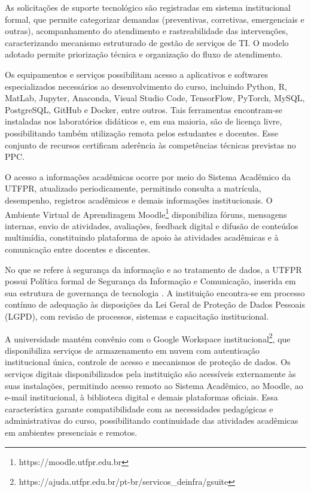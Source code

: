 As solicitações de suporte tecnológico são registradas em sistema institucional formal, que permite categorizar demandas (preventivas, corretivas, emergenciais e outras), acompanhamento do atendimento e rastreabilidade das intervenções, caracterizando mecanismo estruturado de gestão de serviços de TI. O modelo adotado permite priorização técnica e organização do fluxo de atendimento.

Os equipamentos e serviços possibilitam acesso a aplicativos e softwares especializados necessários ao desenvolvimento do curso, incluindo Python, R, MatLab, Jupyter, Anaconda, Visual Studio Code, TensorFlow, PyTorch, MySQL, PostgreSQL, GitHub e Docker, entre outros. Tais ferramentas encontram-se instaladas nos laboratórios didáticos e, em sua maioria, são de licença livre, possibilitando também utilização remota pelos estudantes e docentes. Esse conjunto de recursos certificam aderência às competências técnicas previstas no PPC.

O acesso a informações acadêmicas ocorre por meio do Sistema Acadêmico da UTFPR, atualizado periodicamente, permitindo consulta a matrícula, desempenho, registros acadêmicos e demais informações institucionais. O Ambiente Virtual de Aprendizagem Moodle\footnote{https://moodle.utfpr.edu.br} disponibiliza fóruns, mensagens internas, envio de atividades, avaliações, feedback digital e difusão de conteúdos multimídia, constituindo plataforma de apoio às atividades acadêmicas e à comunicação entre docentes e discentes.

No que se refere à segurança da informação e ao tratamento de dados, a UTFPR possui Política formal de Segurança da Informação e Comunicação, inserida em sua estrutura de governança de tecnologia \cite{UTFPR_Seguranca_2018}. A instituição encontra-se em processo contínuo de adequação às disposições da Lei Geral de Proteção de Dados Pessoais (LGPD), com revisão de processos, sistemas e capacitação institucional.

A universidade mantém convênio com o Google Workspace institucional\footnote{https://ajuda.utfpr.edu.br/pt-br/servicos\_deinfra/gsuite}, que disponibiliza serviços de armazenamento em nuvem com autenticação institucional única, controle de acesso e mecanismos de proteção de dados. Os serviços digitais disponibilizados pela instituição são acessíveis externamente às suas instalações, permitindo acesso remoto ao Sistema Acadêmico, ao Moodle, ao e-mail institucional, à biblioteca digital e demais plataformas oficiais. Essa característica garante compatibilidade com as necessidades pedagógicas e administrativas do curso, possibilitando continuidade das atividades acadêmicas em ambientes presenciais e remotos.

